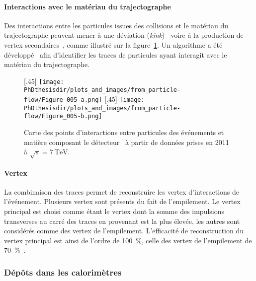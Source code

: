 \paragraph{Interactions avec le matériau du trajectographe}
Des interactions entre les particules issues des collisions et le matériau du trajectographe peuvent mener
à une déviation (\emph{kink})~\cite{moliere_scat_1,moliere_scat_2}
voire
à la production de vertex secondaires~\cite{particle-flow,CMS-TRK-17-001},
comme illustré sur la figure~\ref{fig-chapter-LHC-section-evt_reco-subsec-PF_elements-CMS-self-radio}.
Un algorithme a été développé~\cite{CMS-PAS-TRK-10-003} afin d'identifier les traces de particules ayant interagit avec le matériau du trajectographe.
\begin{figure}[h]
\centering
{}[.45\textwidth]
{\texttt{[image: \\PhDthesisdir/plots\_and\_images/from\_particle-flow/Figure\_005-a.png]}}
\hfill
{}[.45\textwidth]
{\texttt{[image: \\PhDthesisdir/plots\_and\_images/from\_particle-flow/Figure\_005-b.png]}}
\caption[Points d'interactions entre particules des événements et matière du détecteur.]{Carte des points d'interactions entre particules des événements et matière composant le détecteur~\cite{particle-flow,CMS-TRK-17-001} à partir de données prises en 2011 à $\sqrt{s}=\SI{7}{\TeV}$.}
\label{fig-chapter-LHC-section-evt_reco-subsec-PF_elements-CMS-self-radio}
\end{figure}
\paragraph{Vertex}
La combinaison des traces permet de reconstruire les vertex d'interactions de l'événement.
Plusieurs vertex sont présents du fait de l'empilement.
Le vertex principal est choisi comme étant le vertex dont la somme des impulsions transverses au carré des traces en provenant est la plus élevée, les autres sont considérés comme des vertex de l'empilement.
L'efficacité de reconstruction du vertex principal est ainsi de l'ordre de \SI{100}{\%}, celle des vertex de l'empilement de \SI{70}{\%}~\cite{JERC_RunI}.
\subsubsection{Dépôts dans les calorimètres}
